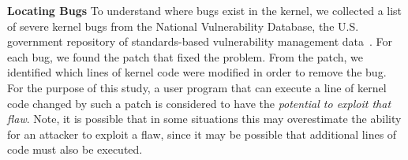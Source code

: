 

\textbf{Locating Bugs}
To understand where bugs exist in the kernel, we collected a list of
severe kernel bugs from the National Vulnerability Database, the U.S. 
government repository of standards-based vulnerability management 
data~\cite{NVD}. For each bug, we
found the patch that fixed the problem.  From the patch, we identified 
which lines of kernel code were modified in order to remove the bug.  
For the purpose of this study, a user program that can execute a line of kernel
code changed by such a patch is considered to have the \textit{potential to 
exploit that flaw}.  Note, it is possible that in some situations this may 
overestimate the ability for an attacker to exploit a flaw, since it may be 
possible that additional lines of code must also be executed.


